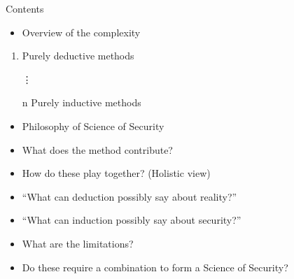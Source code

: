 \begin{frame}
  \begin{block}{Contents}
    \begin{itemize}
      \item Overview of the complexity
    \end{itemize}
    \begin{enumerate}
      \item Purely deductive methods
      \item[\vdots]
      \item[n] Purely inductive methods
    \end{enumerate}
    \begin{itemize}
      \item {Philosophy of Science of Security}
    \end{itemize}
  \end{block}

  \pause

  \begin{remark}
    \begin{itemize}
      \item What does the method contribute?
      \item How do these play together? (Holistic view)
    \end{itemize}
  \end{remark}
\end{frame}

\begin{frame}
  \begin{example}
    \begin{itemize}
      \item \enquote{What can deduction possibly say about reality?}
    \end{itemize}
  \end{example}

  \pause

  \begin{example}
    \begin{itemize}
      \item \enquote{What can induction possibly say about security?}
    \end{itemize}
  \end{example}

  \pause

  \begin{remark}[To focus on]
    \begin{itemize}
      \item What are the limitations?
      \item Do these require a combination to form a Science of Security?
    \end{itemize}
  \end{remark}
\end{frame}

